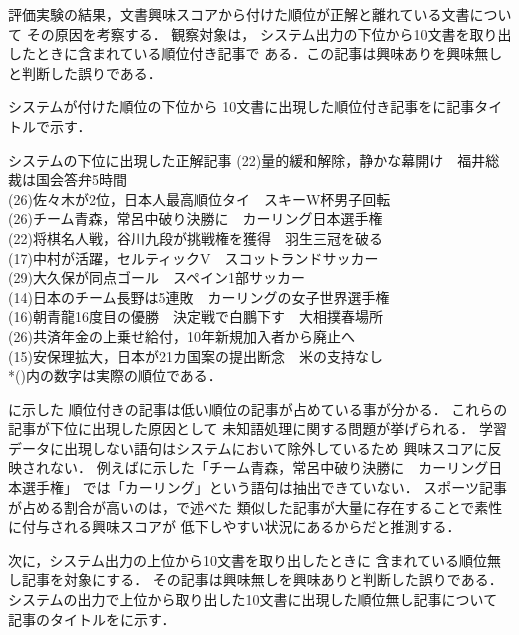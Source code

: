 \documentclass[japanese]{jnlp_1.4}
\newcounter{ex}
\def\ex#1{}
\def\exref#1{}
\def\secref#1{}
\begin{document}
評価実験の結果，文書興味スコアから付けた順位が正解と離れている文書について
その原因を考察する．
観察対象は，
システム出力の下位から10文書を取り出したときに含まれている順位付き記事で
ある．この記事は興味ありを興味無しと判断した誤りである．

システムが付けた順位の下位から
10文書に出現した順位付き記事を\exref{err}に記事タイトルで示す．

\begin{itembox}{\ex{}\label{err}システムの下位に出現した正解記事} 
(22)量的緩和解除，静かな幕開け　福井総裁は国会答弁5時間\\
(26)佐々木が2位，日本人最高順位タイ　スキーW杯男子回転\\
(26)チーム青森，常呂中破り決勝に　カーリング日本選手権\\
(22)将棋名人戦，谷川九段が挑戦権を獲得　羽生三冠を破る\\
(17)中村が活躍，セルティックV　スコットランドサッカー\\
(29)大久保が同点ゴール　スペイン1部サッカー\\
(14)日本のチーム長野は5連敗　カーリングの女子世界選手権\\
(16)朝青龍16度目の優勝　決定戦で白鵬下す　大相撲春場所\\
(26)共済年金の上乗せ給付，10年新規加入者から廃止へ \\
(15)安保理拡大，日本が21カ国案の提出断念　米の支持なし\\
*()内の数字は実際の順位である．
\end{itembox}

\exref{err}に示した
順位付きの記事は低い順位の記事が占めている事が分かる．
これらの記事が下位に出現した原因として
未知語処理に関する問題が挙げられる．
学習データに出現しない語句はシステムにおいて除外しているため
興味スコアに反映されない．
例えば\exref{err}に示した「チーム青森，常呂中破り決勝に　カーリング日本選手権」
では「カーリング」という語句は抽出できていない．
スポーツ記事が占める割合が高いのは，\secref{scoring}で述べた
類似した記事が大量に存在することで素性に付与される興味スコアが
低下しやすい状況にあるからだと推測する．


次に，システム出力の上位から10文書を取り出したときに
含まれている順位無し記事を対象にする．
その記事は興味無しを興味ありと判断した誤りである．
システムの出力で上位から取り出した10文書に出現した順位無し記事について
記事のタイトルを\exref{err2}に示す．
\end{document}
